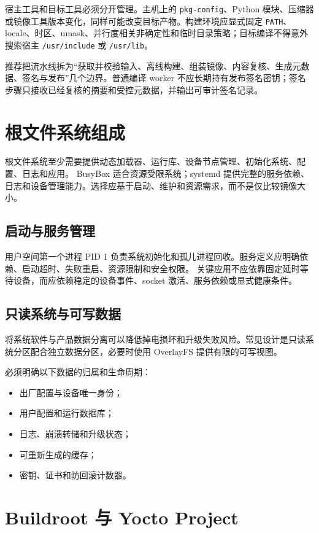 宿主工具和目标工具必须分开管理。主机上的 \texttt{pkg-config}、Python 模块、压缩器或镜像工具版本变化，同样可能改变目标产物。构建环境应显式固定 \texttt{PATH}、locale、时区、umask、并行度相关非确定性和临时目录策略；目标编译不得意外搜索宿主 \texttt{/usr/include} 或 \texttt{/usr/lib}。

推荐把流水线拆为“获取并校验输入、离线构建、组装镜像、内容复核、生成元数据、签名与发布”几个边界。普通编译 worker 不应长期持有发布签名密钥；签名步骤只接收已经复核的摘要和受控元数据，并输出可审计签名记录。

\section{根文件系统组成}

根文件系统至少需要提供动态加载器、运行库、设备节点管理、初始化系统、配置、日志和应用。
BusyBox 适合资源受限系统；systemd 提供完整的服务依赖、日志和设备管理能力。选择应基于启动、维护和资源需求，而不是仅比较镜像大小。

\subsection{启动与服务管理}

用户空间第一个进程 PID 1 负责系统初始化和孤儿进程回收。服务定义应明确依赖、启动超时、失败重启、资源限制和安全权限。
关键应用不应依靠固定延时等待设备，而应依赖稳定的设备事件、socket 激活、服务依赖或显式健康条件。

\subsection{只读系统与可写数据}

将系统软件与产品数据分离可以降低掉电损坏和升级失败风险。常见设计是只读系统分区配合独立数据分区，必要时使用 OverlayFS 提供有限的可写视图。

必须明确以下数据的归属和生命周期：
\begin{itemize}
  \item 出厂配置与设备唯一身份；
  \item 用户配置和运行数据库；
  \item 日志、崩溃转储和升级状态；
  \item 可重新生成的缓存；
  \item 密钥、证书和防回滚计数器。
\end{itemize}

\section{Buildroot 与 Yocto Project}

